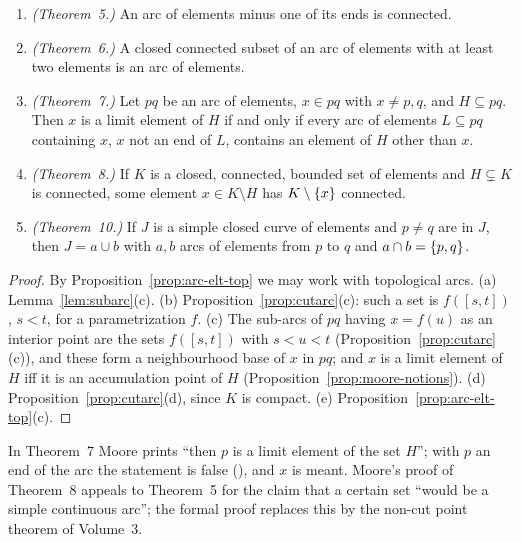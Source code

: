 \begin{theorem}\label{thm:m25-5-10}
\leavevmode
\begin{enumerate}[label=(\alph*)]
\item \emph{(Theorem~5.)} An arc of elements minus one of its ends is connected.
\item \emph{(Theorem~6.)} A closed connected subset of an arc of elements with at least two elements
is an arc of elements.
\item \emph{(Theorem~7.)} Let $pq$ be an arc of elements, $x\in pq$ with $x\ne p,q$, and $H\subseteq
pq$. Then $x$ is a limit element of $H$ if and only if every arc of elements $L\subseteq pq$ containing
$x$, $x$ not an end of $L$, contains an element of $H$ other than $x$.
\item \emph{(Theorem~8.)} If $K$ is a closed, connected, bounded set of elements and $H\subsetneq K$ is
connected, some element $x\in K\setminus H$ has $K\setminus\left\{ x \right\}$ connected.
\item \emph{(Theorem~10.)} If $J$ is a simple closed curve of elements and $p\ne q$ are in $J$, then
$J=a\cup b$ with $a,b$ arcs of elements from $p$ to $q$ and $a\cap b=\left\{ p,q \right\}$.
\end{enumerate}
\end{theorem}

\begin{proof}
By Proposition~\ref{prop:arc-elt-top} we may work with topological arcs. (a) Lemma~\ref{lem:subarc}(c).
(b) Proposition~\ref{prop:cutarc}(c): such a set is $f([s,t])$, $s<t$, for a parametrization $f$.
(c) The sub-arcs of $pq$ having $x=f(u)$ as an interior point are the sets $f([s,t])$ with $s<u<t$
(Proposition~\ref{prop:cutarc}(c)), and these form a neighbourhood base of $x$ in $pq$; and $x$ is a
limit element of $H$ iff it is an accumulation point of $H$ (Proposition~\ref{prop:moore-notions}).
(d) Proposition~\ref{prop:cutarc}(d), since $K$ is compact. (e) Proposition~\ref{prop:arc-elt-top}(c).
\end{proof}


\begin{remark}
In Theorem~7 Moore prints ``then $p$ is a limit element of the set $H$''; with $p$ an end of the arc
the statement is false (), and $x$ is meant. Moore's proof of
Theorem~8 appeals to Theorem~5 for the claim that a certain set ``would be a simple continuous arc'';
the formal proof replaces this by the non-cut point theorem of Volume~3.
\end{remark}

